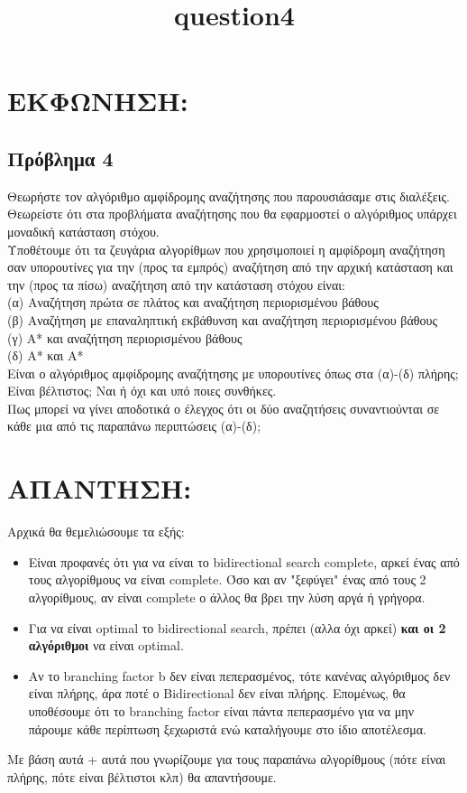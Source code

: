 \documentclass{article}
\begin{document}
\title{\textlatin{question4}}
\maketitle
\section*{ΕΚΦΩΝΗΣΗ:}

\subsection*{Πρόβλημα 4}
Θεωρήστε τον αλγόριθμο αμφίδρομης αναζήτησης που παρουσιάσαμε στις διαλέξεις.\\
Θεωρείστε ότι στα προβλήματα αναζήτησης που θα εφαρμοστεί ο αλγόριθμος
υπάρχει μοναδική κατάσταση στόχου.\\ Υποθέτουμε ότι τα ζευγάρια αλγορίθμων που
χρησιμοποιεί η αμφίδρομη αναζήτηση σαν υπορουτίνες για την (προς τα εμπρός)
αναζήτηση από την αρχική κατάσταση και την (προς τα πίσω) αναζήτηση από την
κατάσταση στόχου είναι:\\
(α) Αναζήτηση πρώτα σε πλάτος και αναζήτηση περιορισμένου βάθους\\
(β) Αναζήτηση με επαναληπτική εκβάθυνση και αναζήτηση περιορισμένου βάθους\\
(γ) Α* και αναζήτηση περιορισμένου βάθους\\
(δ) Α* και Α*\\
Είναι ο αλγόριθμος αμφίδρομης αναζήτησης με υπορουτίνες όπως στα (α)-(δ)
πλήρης; Είναι βέλτιστος; Ναι ή όχι και υπό ποιες συνθήκες.\\
Πως μπορεί να γίνει αποδοτικά ο έλεγχος ότι οι δύο αναζητήσεις συναντιούνται σε
κάθε μια από τις παραπάνω περιπτώσεις (α)-(δ);


\section*{ΑΠΑΝΤΗΣΗ:}
Αρχικά θα θεμελιώσουμε τα εξής:
\begin{itemize}
    \item Είναι προφανές ότι για να είναι το \textlatin{bidirectional search complete}, αρκεί ένας από τους αλγορίθμους να είναι \textlatin{complete}. Όσο και αν "ξεφύγει" ένας από τους 2 αλγορίθμους, αν είναι complete ο άλλος θα βρει την λύση αργά ή γρήγορα.
    
    \item Για να είναι \textlatin{optimal} το \textlatin{bidirectional search}, πρέπει (αλλα όχι αρκεί) \textbf{και οι 2 αλγόριθμοι} να είναι \textlatin{optimal}. \\

    \item Αν το \textlatin{branching factor b} δεν είναι πεπερασμένος, τότε κανένας αλγόριθμος δεν είναι πλήρης, άρα ποτέ ο \textlatin{Bidirectional} δεν είναι πλήρης. Επομένως, θα υποθέσουμε ότι το \textlatin{branching factor} είναι πάντα πεπερασμένο για να μην πάρουμε κάθε περίπτωση ξεχωριστά ενώ καταλήγουμε στο ίδιο αποτέλεσμα.
    
\end{itemize}
Με βάση αυτά + αυτά που γνωρίζουμε για τους παραπάνω αλγορίθμους (πότε είναι πλήρης, πότε είναι βέλτιστοι κλπ) θα απαντήσουμε.
\end{document}
